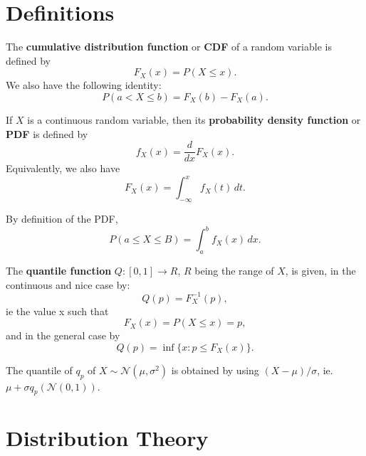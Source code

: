 \documentclass[10pt]{article}
\newcommand{\normal}{\mathscr{N}}
\begin{document}
\section{Definitions}
\begin{outline}
\1 The \textbf{cumulative distribution function} or \textbf{CDF} of a random variable is
defined by
\begin{equation*}
  F_X(x) = P(X\leq x).
\end{equation*}
We also have the following identity:
\begin{equation*}
  P(a<X\leq b) = F_X(b) - F_X(a).
\end{equation*}

\1 If $X$ is a continuous random variable, then its \textbf{probability density function}
or \textbf{PDF} is defined by
\begin{equation*}
  f_X(x) = \frac{d}{dx}F_X(x).
\end{equation*}
Equivalently, we also have
\begin{equation*}
  F_X(x) = \int_{-\infty}^x f_X(t)\,dt.
\end{equation*}

\1 By definition of the PDF, 
\begin{equation*}
  P(a\leq X\leq B) = \int_{a}^bf_X(x)\,dx.
\end{equation*}

\1 The \textbf{quantile function} $Q:[0,1]\to R$, $R$ being the range of $X$, is given, in
the continuous and nice case by:
\begin{equation*}
  Q(p) = F_X^{-1}(p),
\end{equation*}
ie the value x such that 
\begin{equation*}
  F_X(x) = P(X\leq x) = p,
\end{equation*}
and in the general case by
\begin{equation*}
  Q(p) = \inf\{x: p\leq F_X(x)\}.
\end{equation*}

\1 The quantile of $q_p$ of $X\sim\normal(\mu,\sigma^2)$ is obtained by using
$(X-\mu)/\sigma$, ie. $\mu + \sigma q_p(\normal(0,1))$.

\end{outline}

\section{Distribution Theory}
\end{document}
